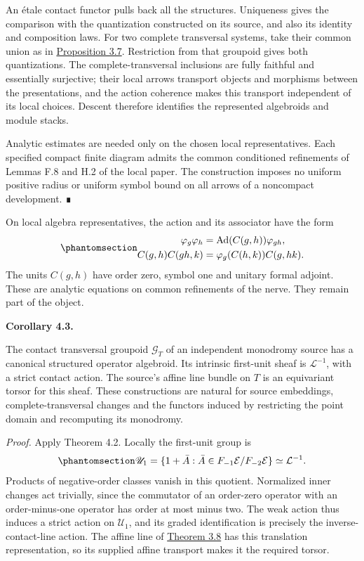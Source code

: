 \documentclass[
  english,
  11pt,
  reqno]{amsart}
\makeatletter
\newcommand{\pandocstatementheading}[1]{%
  \par\addpenalty{\@beginparpenalty}%
  \addvspace{.5\baselineskip plus .2\baselineskip minus .2\baselineskip}%
  {\normalfont\bfseries #1\par}%
  \nobreak\@afterindenttrue\@afterheading
}
\makeatother
\begin{document}
An étale contact functor pulls back all the structures. Uniqueness gives
the comparison with the quantization constructed on its source, and also
its identity and composition laws. For two complete transversal systems,
take their common union as in
\hyperref[prop:holomorphic-null-monodromy]{Proposition 3.7}. Restriction
from that groupoid gives both quantizations. The complete-transversal
inclusions are fully faithful and essentially surjective; their local
arrows transport objects and morphisms between the presentations, and
the action coherence makes this transport independent of its local
choices. Descent therefore identifies the represented algebroids and
module stacks.

Analytic estimates are needed only on the chosen local representatives.
Each specified compact finite diagram admits the common conditioned
refinements of Lemmas F.8 and H.2 of the local paper. The construction
imposes no uniform positive radius or uniform symbol bound on all arrows
of a noncompact development. ∎

On local algebra representatives, the action and its associator have the
form
\begin{equation}\protect\phantomsection\label{eq:groupoid-algebroid-local-coherence}{
\begin{aligned}
\varphi_g\varphi_h
&=\operatorname{Ad}(C(g,h))\varphi_{gh},\\
C(g,h)C(gh,k)
&=\varphi_g(C(h,k))C(g,hk).
\end{aligned}
}\end{equation} The units \(C(g,h)\) have order zero, symbol one and
unitary formal adjoint. These are analytic equations on common
refinements of the nerve. They remain part of the object.

\pandocstatementheading{\protect{}\label{cor:null-monodromy-first-unit-v08}Corollary 4.3.}

The contact transversal groupoid \(\mathcal G_T\) of an independent
monodromy source has a canonical structured operator algebroid. Its
intrinsic first-unit sheaf is \(\mathcal L^{-1}\), with a strict contact
action. The source's affine line bundle on \(T\) is an equivariant
torsor for this sheaf. These constructions are natural for source
embeddings, complete-transversal changes and the functors induced by
restricting the point domain and recomputing its monodromy.

\emph{Proof.} Apply Theorem 4.2. Locally the first-unit group is
\begin{equation}\protect\phantomsection\label{eq:contact-groupoid-first-unit-sheaf}{
\mathscr U_1
=\{1+\bar A:\bar A\in F_{-1}\mathcal E/F_{-2}\mathcal E\}
\simeq\mathcal L^{-1}.
}\end{equation} Products of negative-order classes vanish in this
quotient. Normalized inner changes act trivially, since the commutator
of an order-zero operator with an order-minus-one operator has order at
most minus two. The weak action thus induces a strict action on
\(\mathscr U_1\), and its graded identification is precisely the
inverse-contact-line action. The affine line of
\hyperref[thm:monodromy-affine-forward-construction]{Theorem 3.8} has
this translation representation, so its supplied affine transport makes
it the required torsor.
\end{document}
